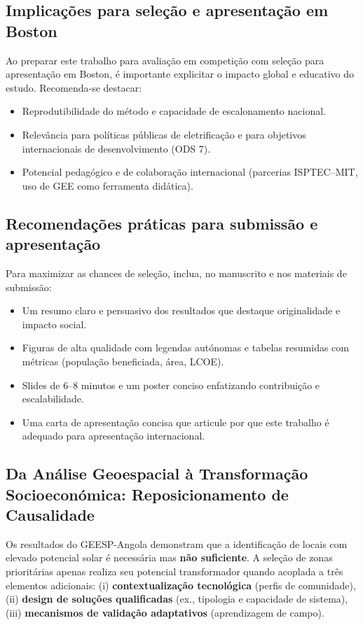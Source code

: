 \documentclass[12pt, a4paper]{article}
\begin{document}
\subsection{Implicações para seleção e apresentação em Boston}
Ao preparar este trabalho para avaliação em competição com seleção para apresentação em Boston, é importante explicitar o impacto global e educativo do estudo. Recomenda‑se destacar:
\begin{itemize}
    \item Reprodutibilidade do método e capacidade de escalonamento nacional.
    \item Relevância para políticas públicas de eletrificação e para objetivos internacionais de desenvolvimento (ODS 7).
    \item Potencial pedagógico e de colaboração internacional (parcerias ISPTEC–MIT, uso de GEE como ferramenta didática).
\end{itemize}

\subsection{Recomendações práticas para submissão e apresentação}
Para maximizar as chances de seleção, inclua, no manuscrito e nos materiais de submissão:
\begin{itemize}
    \item Um resumo claro e persuasivo dos resultados que destaque originalidade e impacto social.
    \item Figuras de alta qualidade com legendas autónomas e tabelas resumidas com métricas (população beneficiada, área, LCOE).
    \item Slides de 6–8 minutos e um poster conciso enfatizando contribuição e escalabilidade.
    \item Uma carta de apresentação concisa que articule por que este trabalho é adequado para apresentação internacional.
\end{itemize}

\subsection{Da Análise Geoespacial à Transformação Socioeconómica: Reposicionamento de Causalidade}

Os resultados do GEESP-Angola demonstram que a identificação de locais com elevado 
potencial solar é necessária mas \textbf{não suficiente}. A seleção de zonas prioritárias 
apenas realiza seu potencial transformador quando acoplada a três elementos adicionais: 
(i) \textbf{contextualização tecnológica} (perfis de comunidade), (ii) \textbf{design de 
soluções qualificadas} (ex., tipologia e capacidade de sistema), (iii) \textbf{mecanismos 
de validação adaptativos} (aprendizagem de campo).
\end{document}
